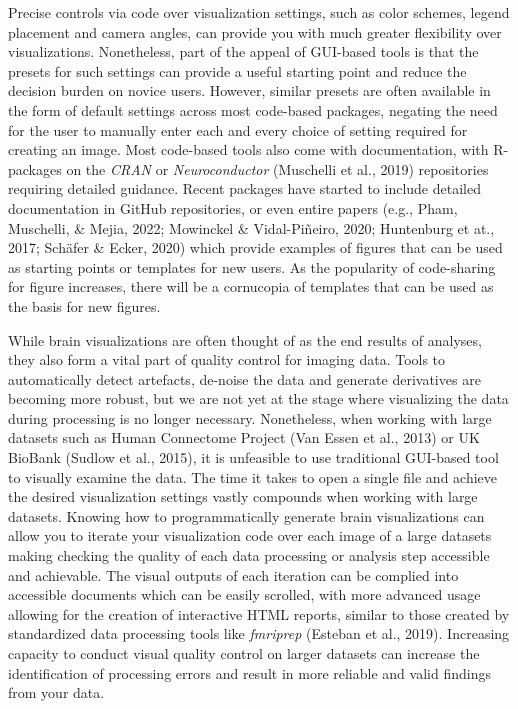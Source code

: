 \documentclass{article}
\begin{document}
Precise controls via code over visualization settings, such as color schemes, legend placement and camera angles, can provide you with much greater flexibility over visualizations. Nonetheless, part of the appeal of GUI-based tools is that the presets for such settings can provide a useful starting point and reduce the decision burden on novice users. However, similar presets are often available in the form of default settings across most code-based packages, negating the need for the user to manually enter each and every choice of setting required for creating an image. Most code-based tools also come with documentation, with R-packages on the \emph{CRAN} or \emph{Neuroconductor} (Muschelli et al., 2019) repositories requiring detailed guidance. Recent packages have started to include detailed documentation in GitHub repositories, or even entire papers (e.g., Pham, Muschelli, \& Mejia, 2022; Mowinckel \& Vidal-Piñeiro, 2020; Huntenburg et at., 2017; Schäfer \& Ecker, 2020) which provide examples of figures that can be used as starting points or templates for new users. As the popularity of code-sharing for figure increases, there will be a cornucopia of templates that can be used as the basis for new figures.

While brain visualizations are often thought of as the end results of analyses, they also form a vital part of quality control for imaging data. Tools to automatically detect artefacts, de-noise the data and generate derivatives are becoming more robust, but we are not yet at the stage where visualizing the data during processing is no longer necessary. Nonetheless, when working with large datasets such as Human Connectome Project (Van Essen et al., 2013) or UK BioBank (Sudlow et al., 2015), it is unfeasible to use traditional GUI-based tool to visually examine the data. The time it takes to open a single file and achieve the desired visualization settings vastly compounds when working with large datasets. Knowing how to programmatically generate brain visualizations can allow you to iterate your visualization code over each image of a large datasets making checking the quality of each data processing or analysis step accessible and achievable. The visual outputs of each iteration can be complied into accessible documents which can be easily scrolled, with more advanced usage allowing for the creation of interactive HTML reports, similar to those created by standardized data processing tools like \emph{fmriprep} (Esteban et al., 2019). Increasing capacity to conduct visual quality control on larger datasets can increase the identification of processing errors and result in more reliable and valid findings from your data.
\end{document}
